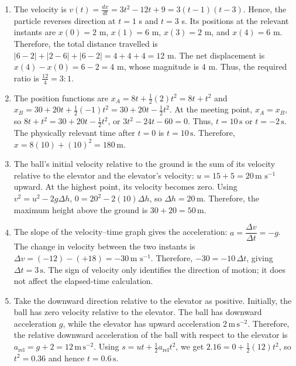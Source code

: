 \documentclass[11pt,a4paper]{article}
\begin{document}
\begin{enumerate}
One-fourth of the maximum speed is $10/4=2.5\,\mathrm{m\,s^{-1}}$. During reversal, the acceleration is $-1\,\mathrm{m\,s^{-2}}$, starting from rest. The time required to attain speed $2.5\,\mathrm{m\,s^{-1}}$ is $t=2.5\,\mathrm{s}$. The displacement during this reversed segment is $s_3=\frac12(-1)(2.5)^2=-\frac{25}{8}\,\mathrm{m}$. Therefore, the displacement from the starting point is $x=x_0+s_3=35-\frac{25}{8}=\frac{255}{8}\,\mathrm{m}$.
\item The velocity is $v(t)=\frac{dx}{dt}=3t^2-12t+9=3(t-1)(t-3)$. Hence, the particle reverses direction at $t=1$ s and $t=3$ s. Its positions at the relevant instants are $x(0)=2$ m, $x(1)=6$ m, $x(3)=2$ m, and $x(4)=6$ m. Therefore, the total distance travelled is $|6-2|+|2-6|+|6-2|=4+4+4=12$ m. The net displacement is $x(4)-x(0)=6-2=4$ m, whose magnitude is $4$ m. Thus, the required ratio is $\frac{12}{4}=3:1$.
\item The position functions are $x_A=8t+\frac12(2)t^2=8t+t^2$ and $x_B=30+20t+\frac12(-1)t^2=30+20t-\frac12t^2$. At the meeting point, $x_A=x_B$, so $8t+t^2=30+20t-\frac12t^2$, or $3t^2-24t-60=0$. Thus, $t=10\,\text{s}$ or $t=-2\,\text{s}$. The physically relevant time after $t=0$ is $t=10\,\text{s}$. Therefore, $x=8(10)+(10)^2=180\,\text{m}$.
\item The ball's initial velocity relative to the ground is the sum of its velocity relative to the elevator and the elevator's velocity: \(u=15+5=20\,\text{m s}^{-1}\) upward. At the highest point, its velocity becomes zero. Using \(v^2=u^2-2g\Delta h\), \(0=20^2-2(10)\Delta h\), so \(\Delta h=20\,\text{m}\). Therefore, the maximum height above the ground is \(30+20=50\,\text{m}\).
\item The slope of the velocity--time graph gives the acceleration: $a=\dfrac{\Delta v}{\Delta t}=-g$. The change in velocity between the two instants is $\Delta v=(-12)-(+18)=-30\,\text{m s}^{-1}$. Therefore, $-30=-10\,\Delta t$, giving $\Delta t=3\,\text{s}$. The sign of velocity only identifies the direction of motion; it does not affect the elapsed-time calculation.
\item Take the downward direction relative to the elevator as positive. Initially, the ball has zero velocity relative to the elevator. The ball has downward acceleration $g$, while the elevator has upward acceleration $2\,\mathrm{m\,s^{-2}}$. Therefore, the relative downward acceleration of the ball with respect to the elevator is $a_{\mathrm{rel}}=g+2=12\,\mathrm{m\,s^{-2}}$. Using $s=u t+\frac{1}{2}a_{\mathrm{rel}}t^2$, we get $2.16=0+\frac{1}{2}(12)t^2$, so $t^2=0.36$ and hence $t=0.6\,\mathrm{s}$.

\end{enumerate}
\end{document}
